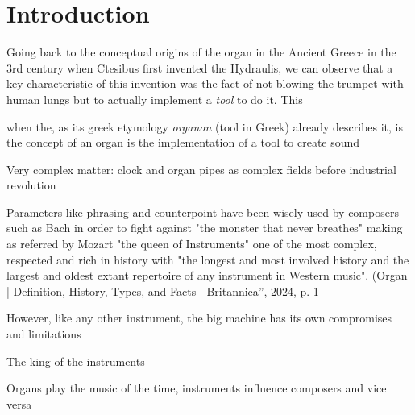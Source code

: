 \chapter{Introduction}

Going back to the conceptual origins of the organ in the Ancient Greece in the 3rd century when Ctesibus first invented the Hydraulis, we can observe that a key characteristic of this invention was the fact of not blowing the trumpet with human lungs but to actually implement a \textit{tool} to do it. This



  when the, as its greek etymology \textit{organon} (tool in Greek) already describes it, is the concept of an organ is the implementation of a tool to create sound 

Very complex matter: clock and organ pipes as complex fields before industrial revolution 



Parameters like phrasing and counterpoint have been wisely used by composers such as Bach in order to fight against "the monster that never breathes" \cite{igorstravinskyandrobertcraftDialoguesDiary1963} making as referred by Mozart "the queen of Instruments" one of the most complex, respected and rich in history with "the longest and most involved history and the largest and oldest extant repertoire of any instrument in Western music". (Organ | Definition, History, Types, and Facts | Britannica”, 2024, p. 1


However, like any other instrument, the big machine has its own compromises and limitations

The king of the instruments 

Organs play the music of the time, instruments influence composers and vice versa 